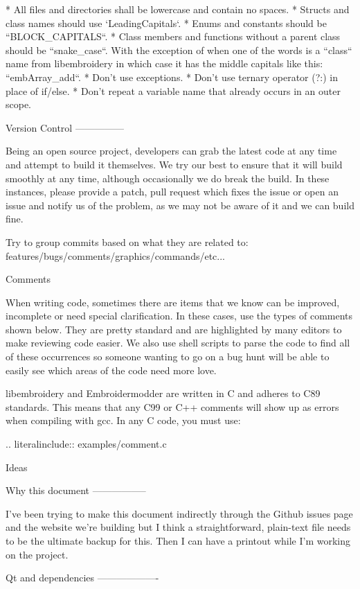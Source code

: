 \documentclass[a4paper]{report}
\begin{document}
{{{{{{* All files and directories shall be lowercase and contain no spaces.
* Structs and class names should use `LeadingCapitals`.
* Enums and constants should be ``BLOCK_CAPITALS``.
* Class members and functions without a parent class should be ``snake_case``. With the exception of when one of the words is a ``class`` name from libembroidery in which case it has the middle capitals like this: ``embArray_add``.
* Don't use exceptions.
* Don't use ternary operator (?:) in place of if/else.
* Don't repeat a variable name that already occurs in an outer scope.

Version Control
---------------

Being an open source project, developers can grab the latest code at any
time and attempt to build it themselves. We try our best to ensure that
it will build smoothly at any time, although occasionally we do break
the build. In these instances, please provide a patch, pull request
which fixes the issue or open an issue and notify us of the problem, as
we may not be aware of it and we can build fine.

Try to group commits based on what they are related to:
features/bugs/comments/graphics/commands/etc...

Comments
~~~~~~~~

When writing code, sometimes there are items that we know can be
improved, incomplete or need special clarification. In these cases, use
the types of comments shown below. They are pretty standard and are
highlighted by many editors to make reviewing code easier. We also use
shell scripts to parse the code to find all of these occurrences so
someone wanting to go on a bug hunt will be able to easily see which
areas of the code need more love.

libembroidery and Embroidermodder are written in C and adheres to C89 standards. This means
that any C99 or C++ comments will show up as errors when compiling with
gcc. In any C code, you must use:

.. literalinclude:: examples/comment.c

Ideas
~~~~~

Why this document
-----------------

I've been trying to make this document indirectly through the Github
issues page and the website we're building but I think a
straightforward, plain-text file needs to be the ultimate backup for
this. Then I can have a printout while I'm working on the project.

Qt and dependencies
-------------------

}}}}}}
\end{document}
